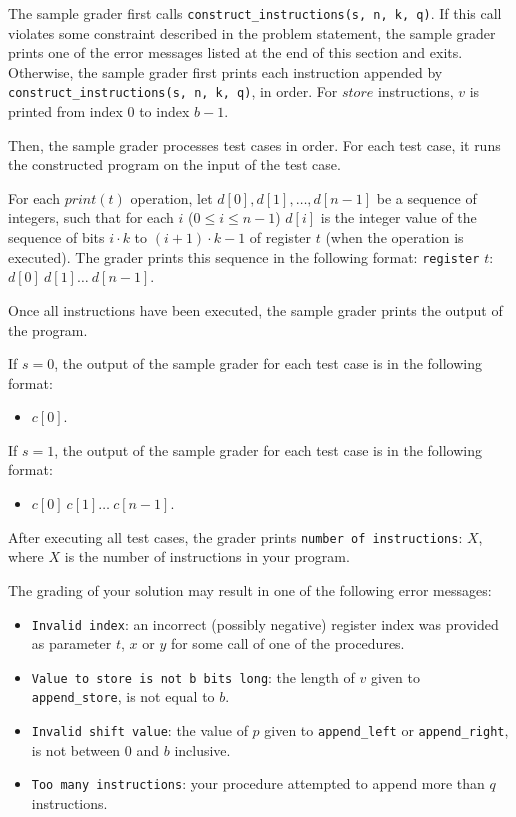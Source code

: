 The sample grader first calls \texttt{construct\_instructions(s, n, k, q)}.  If this call violates some
constraint described in the problem statement, the sample grader prints one of the error messages listed at the end of this section and exits. Otherwise, the sample grader first
prints each instruction appended by \texttt{construct\_instructions(s, n, k, q)}, in order. For $store$
instructions, $v$ is printed from index $0$ to index $b-1$.

Then, the sample grader processes test cases in order. For each test case, it runs the constructed
program on the input of the test case.

For each $print(t)$ operation, let $d[0], d[1], \ldots, d[n-1]$ be a sequence of integers, such that for each $i$ ($0 \leq i \leq n-1$) $d[i]$  is the integer value of the sequence of bits $i\cdot k$ to $(i + 1)\cdot k-1$ of
register $t$ (when the operation is executed). The grader prints this sequence in the following format: \texttt{register} $t$: $d[0]\ d[1]\ldots \ d[n-1]$.

Once all instructions have been executed, the sample grader prints the output of the program.

If $s = 0$, the output of the sample grader for each test case is in the following format:
\begin{itemize}
\item $c[0]$.
\end{itemize}

If $s = 1$, the output of the sample grader for each test case is in the following format:
\begin{itemize}
\item $c[0]\ c[1]\ldots \ c[n-1]$.
\end{itemize}

After executing all test cases, the grader prints \texttt{number of instructions}: $X$, where $X$ is the number of instructions in your program.


The grading of your solution may result in one of the following error messages:

\begin{itemize}
\item \texttt{Invalid index}: an incorrect (possibly negative) register index was provided as parameter $t$,
$x$ or $y$ for some call of one of the procedures.
\item \texttt{Value to store is not b bits long}: the length of $v$ given to  \texttt{append\_store}, is not equal to $b$.
\item \texttt{Invalid shift value}: the value of $p$ given to \texttt{append\_left} or \texttt{append\_right}, is not between $0$ and $b$ inclusive.
\item \texttt{Too many instructions}: your procedure attempted to append more than $q$ instructions.
\end{itemize}
